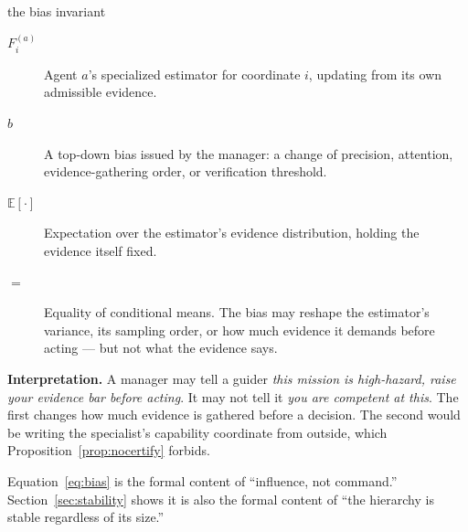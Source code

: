 \documentclass[11pt]{article}
\begin{document}
\begin{equationguide}{the bias invariant}
\begin{description}
\item[{$F^{(a)}_i$}] Agent $a$'s specialized estimator for coordinate $i$, updating from its own admissible evidence.
\item[{$b$}] A top-down bias issued by the manager: a change of precision, attention, evidence-gathering order, or verification threshold.
\item[{$\mathbb{E}[\cdot]$}] Expectation over the estimator's evidence distribution, holding the evidence itself fixed.
\item[{$=$}] Equality of conditional means. The bias may reshape the estimator's variance, its sampling order, or how much evidence it demands before acting --- but not what the evidence says.
\end{description}
\textbf{Interpretation.} A manager may tell a guider \emph{this mission is high-hazard, raise your evidence bar before acting}. It may not tell it \emph{you are competent at this}. The first changes how much evidence is gathered before a decision. The second would be writing the specialist's capability coordinate from outside, which Proposition~\ref{prop:nocertify} forbids.
\end{equationguide}

Equation~\eqref{eq:bias} is the formal content of ``influence, not command.'' Section~\ref{sec:stability} shows it is also the formal content of ``the hierarchy is stable regardless of its size.''
\end{document}
